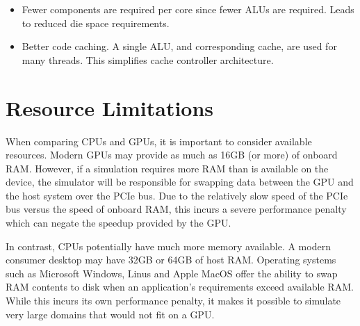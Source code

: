 \begin{itemize}
	\item Fewer components are required per core since fewer ALUs are required. Leads to reduced die space requirements.
	\item Better code caching. A single ALU, and corresponding cache, are used for many threads. This simplifies cache controller architecture.
\end{itemize}

\section{Resource Limitations}

When comparing CPUs and GPUs, it is important to consider available resources. Modern GPUs may provide as much as 16GB (or more) of onboard RAM. However, if a simulation requires more RAM than is available on the device, the simulator will be responsible for swapping data between the GPU and the host system over the PCIe bus. Due to the relatively slow speed of the PCIe bus versus the speed of onboard RAM, this incurs a severe performance penalty which can negate the speedup provided by the GPU. 

In contrast, CPUs potentially have much more memory available. A modern consumer desktop may have 32GB or 64GB of host RAM. Operating systems such as Microsoft Windows, Linus and Apple MacOS offer the ability to swap RAM contents to disk when an application's requirements exceed available RAM. While this incurs its own performance penalty, it makes it possible to simulate very large domains that would not fit on a GPU. 






